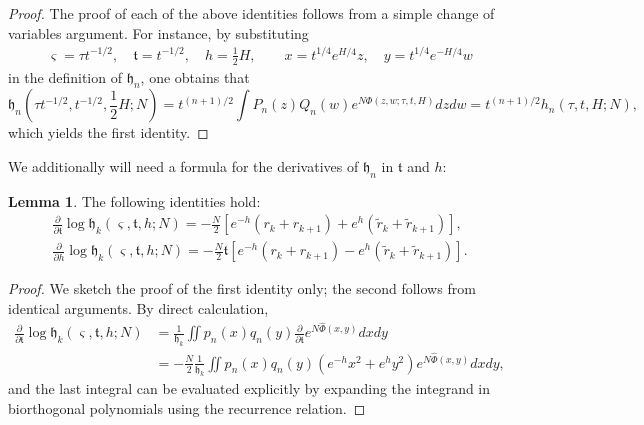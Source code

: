 \documentclass[usenames,dvipsnames]{article}
\theoremstyle{definition}
\newtheorem{lemma}{Lemma}[section]
\numberwithin{equation}{section}
\numberwithin{figure}{section}
\begin{document}
        \begin{proof}
            The proof of each of the above identities follows from a simple change of variables argument. For instance, by substituting 
            \begin{align*}
                \varsigma = \tau t^{-1/2}, \quad \mathfrak{t}=t^{-1/2}, \quad h= \frac{1}{2}H, \qquad x=t^{1/4}e^{H/4}z,\quad y=t^{1/4}e^{-H/4}w
            \end{align*}
            in the definition of $\mathfrak{h}_n$, one obtains that
            \begin{equation*}
                \mathfrak{h}_n\left(\tau t^{-1/2},t^{-1/2},\frac{1}{2}H;N\right) = t^{(n+1)/2}\int P_n(z)Q_n(w)e^{N\Phi(z,w;\tau,t,H)}dzdw = t^{(n+1)/2}h_n(\tau,t,H;N),
            \end{equation*}
            which yields the first identity.
        \end{proof}
    We additionally will need a formula for the derivatives of $\mathfrak{h}_n$ in $\mathfrak{t}$ and $h$:
    \begin{lemma}\label{lemmaA2}
        The following identities hold:
        \begin{align}
            \frac{\partial}{\partial \mathfrak{t}} \log \mathfrak{h}_k(\varsigma,\mathfrak{t},h;N) = -\frac{N}{2}\left[e^{-h}(r_k+r_{k+1}) + e^{h}(\tilde{r}_k+\tilde{r}_{k+1})\right],\\
            \frac{\partial}{\partial h} \log \mathfrak{h}_k(\varsigma,\mathfrak{t},h;N) = -\frac{N}{2}\mathfrak{t}\left[e^{-h}(r_k+r_{k+1}) - e^{h}(\tilde{r}_k+\tilde{r}_{k+1})\right].
        \end{align}
    \end{lemma}
    \begin{proof}
        We sketch the proof of the first identity only; the second follows from identical arguments. By direct calculation,
            \begin{align*}
                \frac{\partial}{\partial \mathfrak{t}} \log \mathfrak{h}_k(\varsigma,\mathfrak{t},h;N) 
                &= \frac{1}{\mathfrak{h}_k}\iint p_n(x)q_n(y)\frac{\partial}{\partial \mathfrak{t}}e^{N\hat{\Phi}(x,y)}dxdy\\
                &=-\frac{N}{2}\frac{1}{\mathfrak{h}_k}\iint p_n(x)q_n(y)\left(e^{-h}x^2+e^{h}y^2\right)e^{N\hat{\Phi}(x,y)}dxdy,
            \end{align*}
        and the last integral can be evaluated explicitly by expanding the integrand in biorthogonal polynomials using the recurrence relation.
    \end{proof}
        
\end{document}
